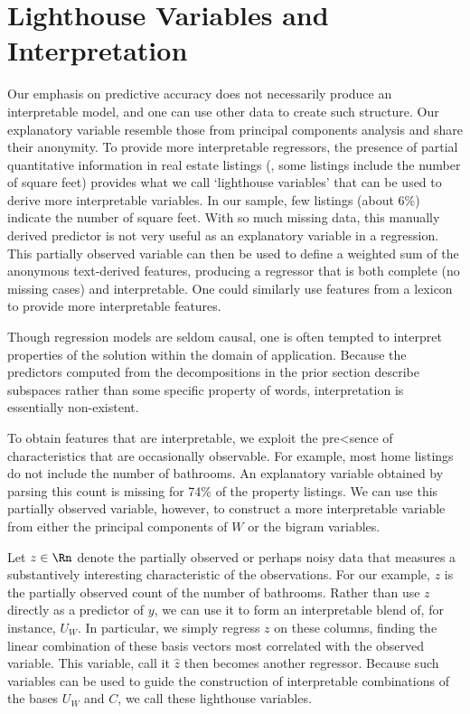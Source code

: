 \documentclass[12pt]{article}
\begin{document}
\section{Lighthouse Variables and Interpretation}
\label{sec:light}
 
 

 Our emphasis on predictive accuracy does not necessarily produce an
 interpretable model, and one can use other data to create such structure.  Our
 explanatory variable resemble those from principal components analysis and
 share their anonymity.  To provide more interpretable regressors, the presence
 of partial quantitative information in real estate listings (\eg, some listings
 include the number of square feet) provides what we call ‘lighthouse variables’
 that can be used to derive more interpretable variables.  In our sample, few
 listings (about 6\%) indicate the number of square feet.  With so much missing
 data, this manually derived predictor is not very useful as an explanatory
 variable in a regression.  This partially observed variable can then be used to
 define a weighted sum of the anonymous text-derived features, producing a
 regressor that is both complete (no missing cases) and interpretable.  One
 could similarly use features from a lexicon to provide more interpretable
 features.


Though regression models are seldom causal, one is often tempted to interpret
 properties of the solution within the domain of application.  Because the
 predictors computed from the decompositions in the prior section describe
 subspaces rather than some specific property of words, interpretation is
 essentially non-existent.


 To obtain features that are interpretable, we exploit the pre<sence of
 characteristics that are occasionally observable.  For example,
 most home listings do not include the number of bathrooms.  An
 explanatory variable obtained by parsing this count is missing for 74\% of the property listings.  We can use this partially observed variable, however, to construct a more interpretable variable from either the principal components of $W$ or the bigram variables.  


 Let $z \in \Rn$ denote the partially observed or perhaps noisy data
 that measures a substantively interesting characteristic of the
 observations.  For our example, $z$ is the partially observed count of the number of bathrooms.  Rather than use $z$ directly as a predictor of $y$, we
 can use it to form an interpretable blend of, for instance, $U_W$.   In
 particular, we simply regress $z$ on these columns, finding the
 linear combination of these basis vectors most correlated with the
 observed variable.  This variable, call it $\hat{z}$ then becomes
 another regressor.  Because such variables can be used to guide the
 construction of interpretable combinations of the bases $U_W$ and
 $C$, we call these lighthouse variables.  
 
\end{document}
